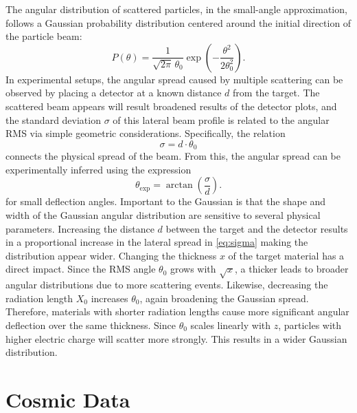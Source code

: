\documentclass[sn-mathphys-num,iicol]{sn-jnl}
\theoremstyle{thmstyleone}
\theoremstyle{thmstyletwo}
\theoremstyle{thmstylethree}
\begin{document}
The angular distribution of scattered particles, in the small-angle approximation, follows a Gaussian probability distribution centered around the initial direction of the particle beam:
\begin{equation}\label{eq:Gauss}
P(\theta) = \frac{1}{\sqrt{2\pi} \, \theta_0} \exp\left( -\frac{\theta^2}{2\theta_0^2} \right).
\end{equation}
In experimental setups, the angular spread caused by multiple scattering can be observed by placing a detector at a known distance $d$ from the target. The scattered beam appears will result broadened results of the detector plots, and the standard deviation $\sigma$ of this lateral beam profile is related to the angular RMS via simple geometric considerations. Specifically, the relation
\begin{equation}\label{eq:sigma}
    \sigma = d \cdot \theta_0
\end{equation}
connects the physical spread of the beam. From this, the angular spread can be experimentally inferred using the expression
\begin{equation}\label{eq:theta_exp}
\theta_{\text{exp}} = \arctan\left( \frac{\sigma}{d} \right).
\end{equation}
for small deflection angles. Important to the Gaussian is that the shape and width of the Gaussian angular distribution are sensitive to several physical parameters. Increasing the distance $d$ between the target and the detector results in a proportional increase in the lateral spread in  \autoref{eq:sigma} making the distribution appear wider.
Changing the thickness $x$ of the target material has a direct impact. Since the RMS angle $\theta_0$ grows with $\sqrt{x}$, a thicker leads to broader angular distributions due to more scattering events. Likewise, decreasing the radiation length $X_0$ increases $\theta_0$, again broadening the Gaussian spread. Therefore, materials with shorter radiation lengths cause more significant angular deflection over the same thickness.
Since $\theta_0$ scales linearly with $z$, particles with higher electric charge will scatter more strongly. This results in a wider Gaussian distribution.


\section{Cosmic Data}
\end{document}
